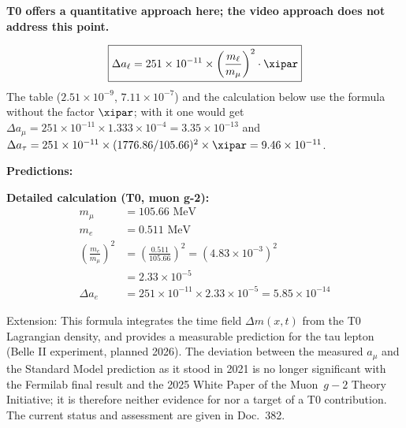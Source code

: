 	\begin{vorteil}
		\textbf{T0 offers a quantitative approach here; the video approach does not address this point.}
		
		\begin{equation}
			\boxed{\Delta a_\ell = 251 \times 10^{-11} \times \left( \frac{m_\ell}{m_\mu} \right)^2 \cdot \xipar}
		\end{equation}
		The table ($2.51\times10^{-9}$, $7.11\times10^{-7}$) and the calculation below use the formula without the factor $\xipar$; with it one would get $\Delta a_\mu = 251\times10^{-11}\times1.333\times10^{-4} = 3.35\times10^{-13}$ and $\Delta a_\tau = 251\times10^{-11}\times(1776.86/105.66)^2\times\xipar = 9.46\times10^{-11}$.
		
		\textbf{Predictions:}
		\begin{center}
		\end{center}
		
		
		\textbf{Detailed calculation (T0, muon g-2):}
		\begin{align}
			m_\mu &= 105.66 \text{ MeV} \\
			m_e &= 0.511 \text{ MeV} \\
			\left( \frac{m_e}{m_\mu} \right)^2 &= \left( \frac{0.511}{105.66} \right)^2 = (4.83 \times 10^{-3})^2 \\
			&= 2.33 \times 10^{-5} \\
			\Delta a_e &= 251 \times 10^{-11} \times 2.33 \times 10^{-5} = 5.85 \times 10^{-14}
		\end{align}
		
		
		Extension: This formula integrates the time field $\Delta m(x,t)$ from the T0 Lagrangian density, and provides a measurable prediction for the tau lepton (Belle II experiment, planned 2026). The deviation between the measured $a_\mu$ and the Standard Model prediction as it stood in 2021 is no longer significant with the Fermilab final result and the 2025 White Paper of the Muon~$g-2$ Theory Initiative; it is therefore neither evidence for nor a target of a T0 contribution. The current status and assessment are given in Doc.~382.
	\end{vorteil}
	
